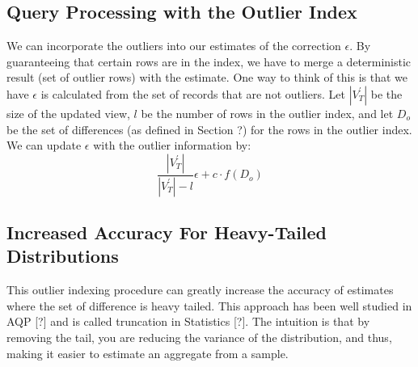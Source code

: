 \subsection{Query Processing with the Outlier Index}

We can incorporate the outliers into our estimates of the correction
$\epsilon$. By guaranteeing that certain rows are in the index, we
have to merge a deterministic result (set of outlier rows) with the
estimate. One way to think of this is that we have $\epsilon$ is
calculated from the set of records that are not outliers. Let $|V_{T}^{'}|$
be the size of the updated view, $l$ be the number of rows in the
outlier index, and let $D_{o}$ be the set of differences (as defined
in Section ?) for the rows in the outlier index. We can update $\epsilon$
with the outlier information by:
\[
\frac{|V_{T}^{'}|}{|V_{T}^{'}|-l}\epsilon+c\cdot f(D_{o})
\]


\subsection{Increased Accuracy For Heavy-Tailed Distributions}

This outlier indexing procedure can greatly increase the accuracy
of estimates where the set of difference is heavy tailed. This approach
has been well studied in AQP {[}?{]} and is called truncation in Statistics
{[}?{]}. The intuition is that by removing the tail, you are reducing
the variance of the distribution, and thus, making it easier to estimate
an aggregate from a sample.